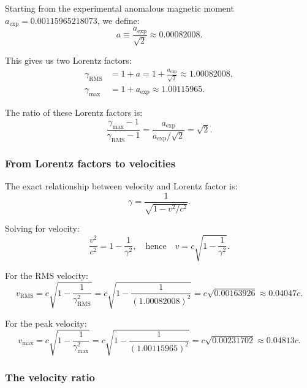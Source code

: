 \documentclass[12pt,letterpaper]{article}
\begin{document}
Starting from the experimental anomalous magnetic moment $a_{\mathrm{exp}} = 0.00115965218073$, we define:
\begin{equation}
a \equiv \frac{a_{\mathrm{exp}}}{\sqrt{2}} \approx 0.00082008.
\end{equation}

This gives us two Lorentz factors:
\begin{align}
\gamma_{\mathrm{RMS}} &= 1 + a = 1 + \frac{a_{\mathrm{exp}}}{\sqrt{2}} \approx 1.00082008, \\
\gamma_{\max} &= 1 + a_{\mathrm{exp}} \approx 1.00115965.
\end{align}

The ratio of these Lorentz factors is:
\begin{equation}
\frac{\gamma_{\max} - 1}{\gamma_{\mathrm{RMS}} - 1} = \frac{a_{\mathrm{exp}}}{a_{\mathrm{exp}}/\sqrt{2}} = \sqrt{2}.
\end{equation}

\subsubsection{From Lorentz factors to velocities}

The exact relationship between velocity and Lorentz factor is:
\begin{equation}
\gamma = \frac{1}{\sqrt{1 - v^2/c^2}}.
\end{equation}

Solving for velocity:
\begin{equation}
\frac{v^2}{c^2} = 1 - \frac{1}{\gamma^2}, \quad \text{hence} \quad v = c\sqrt{1 - \frac{1}{\gamma^2}}.
\end{equation}

For the RMS velocity:
\begin{equation}
v_{\mathrm{RMS}} = c\sqrt{1 - \frac{1}{\gamma_{\mathrm{RMS}}^2}} = c\sqrt{1 - \frac{1}{(1.00082008)^2}} = c\sqrt{0.00163926} \approx 0.04047c.
\end{equation}

For the peak velocity:
\begin{equation}
v_{\max} = c\sqrt{1 - \frac{1}{\gamma_{\max}^2}} = c\sqrt{1 - \frac{1}{(1.00115965)^2}} = c\sqrt{0.00231702} \approx 0.04813c.
\end{equation}

\subsubsection{The velocity ratio}
\end{document}
